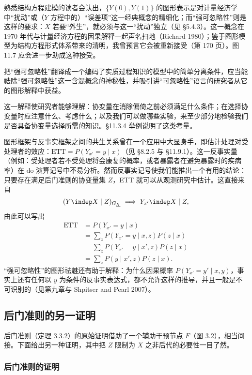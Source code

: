 熟悉结构方程建模的读者会认出，$\{Y(0),Y(1)\}$ 的图形表示是对计量经济学中“扰动”或（$Y$ 方程中的）“误差项”这一经典概念的精细化；而“强可忽略性”则是这样的要求：$X$ 若要“外生”，就必须与这一“扰动”独立（见 \S 5.4.3）。这一概念在 1970 年代与计量经济方程的因果解释一起声名扫地（Richard 1980）；鉴于图形模型为结构方程形式体系带来的清明，我曾预言它会被重新接受（第 170 页）。图 11.7 应会进一步助成这种接受。

把“强可忽略性”翻译成一个编码了实质过程知识的模型中的简单分离条件，应当能祛除“强可忽略性”这一含混概念的神秘性，并吸引讲“可忽略性”语言的研究者从它的图形解释中获益。

这一解释使研究者能够理解：协变量在消除偏倚之前必须满足什么条件；在选择协变量时应注意什么、考虑什么；以及我们可以做哪些实验，来至少部分地检验我们是否具备协变量选择所需的知识。\S 11.3.4 举例说明了这类考量。

图形框架与反事实框架之间的共生关系曾在一个应用中大显身手，即估计处理对受处理者的效应：$\mathrm{ETT}=P(Y_{x'}=y\mid x)$（见 \S 8.2.5 与 \S 11.9.1）。这一反事实量（例如：受处理者若不受处理将会康复的概率，或者暴露者在避免暴露时的疾病率）在 do 演算记号中不易分析。然而反事实记号使我们能推出一个有用的结论：只要存在满足后门准则的协变量集 $Z$，ETT 就可以从观测研究中估计。这直接来自
\[
(Y\indep X\mid Z)_{G_{\underline{X}}}\ \Longrightarrow\ Y_{x'}\indep X\mid Z,
\]
由此可以写出
\[
\begin{aligned}
\mathrm{ETT} &= P(Y_{x'}=y\mid x)\\
&= \sum_{z}P(Y_{x'}=y\mid x,z)P(z\mid x)\\
&= \sum_{z}P(Y_{x'}=y\mid x',z)P(z\mid x)\\
&= \sum_{z}P(y\mid x',z)P(z\mid x).
\end{aligned}
\]
“强可忽略性”的图形祛魅还有助于解释：为什么因果概率 $P(Y_{x'}=y'\mid x,y)$，事实上还有任何以 $y$ 为条件的反事实表达式，都不允许这样的推导，并且一般是不可识别的（见第九章与 Shpitser and Pearl 2007）。

\subsection{后门准则的另一证明}

后门准则（定理 3.3.2）的原始证明借助了一个辅助干预节点 $F$（图 3.2），相当间接。下面给出另一种证明，其中把 $Z$ 限制为 $X$ 之非后代的必要性一目了然。

\subsubsection*{后门准则的证明}

